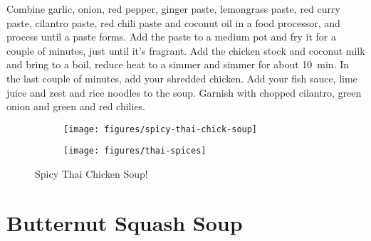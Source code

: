 Combine garlic, onion, red pepper, ginger paste, lemongrass paste, red curry
paste, cilantro paste, red chili paste and coconut oil in a food processor, and
process until a paste forms. Add the paste to a medium pot and fry it for a
couple of minutes, just until it's fragrant. Add the chicken stock and coconut
milk and bring to a boil, reduce heat to a simmer and simmer for about
\SI{10}{\minute}. In the last couple of minutes, add your shredded chicken. Add
your fish sauce, lime juice and zest and rice noodles to the soup. Garnish with
chopped cilantro, green onion and green and red chilies.
\begin{figure}
    \centering
    \begin{subfigure}{0.4\textwidth}
        \centering
        \texttt{[image: figures/spicy-thai-chick-soup]}
    \end{subfigure}
    \begin{subfigure}{0.4\textwidth}
        \centering
        \texttt{[image: figures/thai-spices]}
    \end{subfigure}
    \caption*{Spicy Thai Chicken Soup!}
\end{figure}

\section{Butternut Squash Soup}

